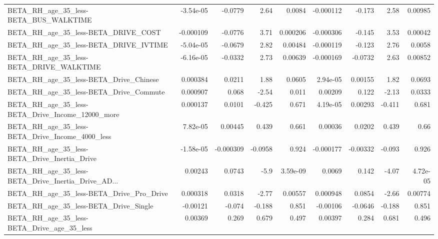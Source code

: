 \begin{tabular}{lrrrrrrrr}
BETA\_RH\_age\_35\_less-BETA\_BUS\_WALKTIME              &   -3.54e-05 &      -0.0779 &     2.64 &   0.0084 &  -0.000112 &      -0.173 &         2.58 &       0.00985 \\
BETA\_RH\_age\_35\_less-BETA\_DRIVE\_COST                &   -0.000109 &      -0.0776 &     3.71 & 0.000206 &  -0.000306 &      -0.145 &         3.53 &       0.00042 \\
BETA\_RH\_age\_35\_less-BETA\_DRIVE\_IVTIME              &   -5.04e-05 &      -0.0679 &     2.82 &  0.00484 &  -0.000119 &      -0.123 &         2.76 &        0.0058 \\
BETA\_RH\_age\_35\_less-BETA\_DRIVE\_WALKTIME            &   -6.16e-05 &      -0.0332 &     2.73 &  0.00639 &  -0.000169 &     -0.0732 &         2.63 &       0.00852 \\
BETA\_RH\_age\_35\_less-BETA\_Drive\_Chinese             &    0.000384 &       0.0211 &     1.88 &   0.0605 &   2.94e-05 &     0.00155 &         1.82 &        0.0693 \\
BETA\_RH\_age\_35\_less-BETA\_Drive\_Commute             &    0.000907 &        0.068 &    -2.54 &    0.011 &    0.00209 &       0.122 &        -2.13 &        0.0333 \\
BETA\_RH\_age\_35\_less-BETA\_Drive\_Income\_12000\_more   &    0.000137 &       0.0101 &   -0.425 &    0.671 &   4.19e-05 &     0.00293 &       -0.411 &         0.681 \\
BETA\_RH\_age\_35\_less-BETA\_Drive\_Income\_4000\_less    &    7.82e-05 &      0.00445 &    0.439 &    0.661 &    0.00036 &      0.0202 &        0.439 &          0.66 \\
BETA\_RH\_age\_35\_less-BETA\_Drive\_Inertia\_Drive       &   -1.58e-05 &    -0.000309 &  -0.0958 &    0.924 &  -0.000177 &    -0.00332 &       -0.093 &         0.926 \\
BETA\_RH\_age\_35\_less-BETA\_Drive\_Inertia\_Drive\_AD... &     0.00243 &       0.0743 &     -5.9 & 3.59e-09 &     0.0069 &       0.142 &        -4.07 &      4.72e-05 \\
BETA\_RH\_age\_35\_less-BETA\_Drive\_Pro\_Drive           &    0.000318 &       0.0318 &    -2.77 &  0.00557 &   0.000948 &      0.0854 &        -2.66 &       0.00774 \\
BETA\_RH\_age\_35\_less-BETA\_Drive\_Single              &    -0.00121 &       -0.074 &   -0.188 &    0.851 &   -0.00106 &     -0.0646 &       -0.188 &         0.851 \\
BETA\_RH\_age\_35\_less-BETA\_Drive\_age\_35\_less         &     0.00369 &        0.269 &    0.679 &    0.497 &    0.00397 &       0.284 &        0.681 &         0.496 \\

\end{tabular}
